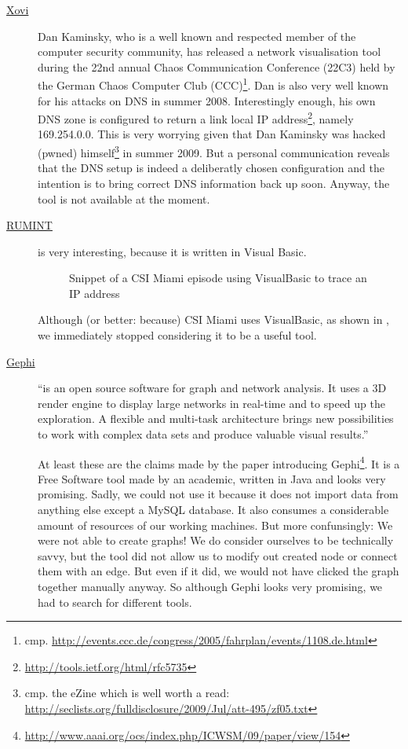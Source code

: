 \documentclass[a4paper,
    11pt,
    normalheadings,
    parindent,
    UKenglish,
    abstracton,
    ]{scrartcl}
\begin{document}
\begin{description}
    \item[\href{http://www.doxpara.com}{Xovi}]
        Dan Kaminsky, who is a well known and respected member of the computer security community, has released a network visualisation tool during the 22nd annual Chaos Communication Conference (22C3) held by the German Chaos Computer Club (CCC)\footnote{cmp. \url{http://events.ccc.de/congress/2005/fahrplan/events/1108.de.html}}.
        Dan is also very well known for his attacks on DNS in summer 2008.
        Interestingly enough, his own DNS zone is configured to return a link local IP address\footnote{\url{http://tools.ietf.org/html/rfc5735}}, namely 169.254.0.0.
        This is very worrying given that Dan Kaminsky was hacked (pwned) himself\footnote{cmp. the eZine which is well worth a read: \url{http://seclists.org/fulldisclosure/2009/Jul/att-495/zf05.txt}} in summer 2009.
        But a personal communication reveals that the DNS setup is indeed a deliberatly chosen configuration and the intention is to bring correct DNS information back up soon.
        Anyway, the tool is not available at the moment.

    \item[\href{http://www.rumint.org/}{RUMINT}]
        is very interesting, because it is written in Visual Basic.
        \begin{figure}
            \begin{center}\end{center}
            \caption{Snippet of a CSI Miami episode using VisualBasic to trace an IP address}
        \end{figure}
        Although (or better: because) CSI Miami uses VisualBasic, as shown in , we immediately stopped considering it to be a useful tool.


    \item[\href{http://www.gephi.org}{Gephi}]
        ``is an open source software for graph and network analysis. It uses a 3D render engine to display large networks in real-time and to speed up the exploration. A flexible and multi-task architecture brings new possibilities to work with complex data sets and produce valuable visual results.''

        At least these are the claims made by the paper introducing Gephi\footnote{\url{http://www.aaai.org/ocs/index.php/ICWSM/09/paper/view/154}}.
        It is a Free Software tool made by an academic, written in Java and looks very promising.
        Sadly, we could not use it because it does not import data from anything else except a MySQL database.
        It also consumes a considerable amount of resources of our working machines.
        But more confunsingly: We were not able to create graphs!
        We do consider ourselves to be technically savvy, but the tool did not allow us to modify out created node or connect them with an edge.
        But even if it did, we would not have clicked the graph together manually anyway.
        So although Gephi looks very promising, we had to search for different tools.


\end{description}
\end{document}
